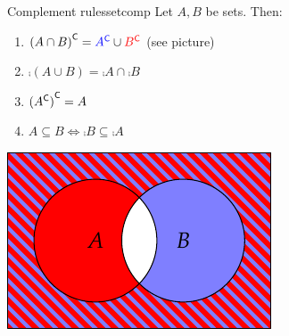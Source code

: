 \begin{thm}[lower separated=false, sidebyside, sidebyside align=top seam, sidebyside gap=0pt, righthand width=0.4\linewidth]{Complement rules}{setcomp}
	Let $A,B$ be sets. Then:
	\begin{enumerate}\itemsep2pt
		\item ${(A\cap B)}^{\mathsf{C}}=\textcolor{blue}{{A}^{\mathsf{C}}}\cup \textcolor{red}{{B}^{\mathsf{C}}}$ (see picture)
		\item $\comp{(A\cup B)}=\comp A\cap \comp B$
		\item $\smash[t]{{({A}^{\mathsf{C}})}^{\mathsf{C}}}=A$
		\item $A\subseteq B\iff \comp B\subseteq \comp A$
	\end{enumerate}
	\tcblower
	\flushright
	\includegraphics[scale=1]{sets-08-venndemorgan2}
\end{thm}



